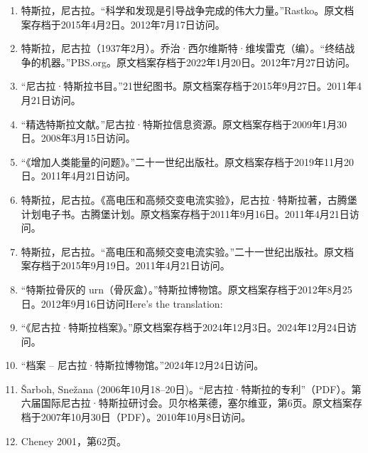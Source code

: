 \begin{enumerate}
\item 特斯拉，尼古拉。“科学和发现是引导战争完成的伟大力量。”Rastko。原文档案存档于2015年4月2日。2012年7月17日访问。  
\item 特斯拉，尼古拉（1937年2月）。乔治·西尔维斯特·维埃雷克（编）。“终结战争的机器。”PBS.org。原文档案存档于2022年1月20日。2012年7月27日访问。  
\item “尼古拉·特斯拉书目。”21世纪图书。原文档案存档于2015年9月27日。2011年4月21日访问。  
\item “精选特斯拉文献。”尼古拉·特斯拉信息资源。原文档案存档于2009年1月30日。2008年3月15日访问。
\item “《增加人类能量的问题》。”二十一世纪出版社。原文档案存档于2019年11月20日。2011年4月21日访问。  
\item 特斯拉，尼古拉。《高电压和高频交变电流实验》，尼古拉·特斯拉著，古腾堡计划电子书。古腾堡计划。原文档案存档于2011年9月16日。2011年4月21日访问。  
\item 特斯拉，尼古拉。“高电压和高频交变电流实验。”二十一世纪出版社。原文档案存档于2015年9月19日。2011年4月21日访问。  
\item “特斯拉骨灰的 urn（骨灰盒）。”特斯拉博物馆。原文档案存档于2012年8月25日。2012年9月16日访问Here’s the translation:
\item “《尼古拉·特斯拉档案》。”原文档案存档于2024年12月3日。2024年12月24日访问。  
\item “档案 – 尼古拉·特斯拉博物馆。”2024年12月24日访问。  
\item Šarboh, Snežana (2006年10月18–20日)。“尼古拉·特斯拉的专利”（PDF）。第六届国际尼古拉·特斯拉研讨会。贝尔格莱德，塞尔维亚，第6页。原文档案存档于2007年10月30日（PDF）。2010年10月8日访问。  
\item Cheney 2001，第62页。
\end{enumerate}
